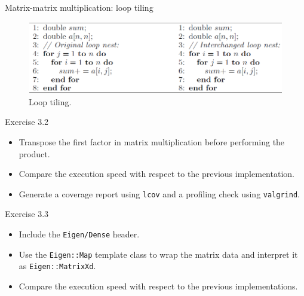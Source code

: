 \documentclass[10pt]{beamer}
\begin{document}
\begin{frame}{Matrix-matrix multiplication: loop tiling}
    \begin{figure}
        \centering
        \includegraphics[width=\textwidth]{images/loop_tiling.png}
        \caption{Loop tiling.}
    \end{figure}
\end{frame}

\begin{frame}{Exercise 3.2}
    \begin{itemize}
        \item Transpose the first factor in matrix multiplication before performing the product.
        \item Compare the execution speed with respect to the previous implementation.
        \item Generate a coverage report using \texttt{lcov} and a profiling check using \texttt{valgrind}.
    \end{itemize}
\end{frame}

\begin{frame}{Exercise 3.3}
    \begin{itemize}
        \item Include the \texttt{Eigen/Dense} header.
        \item Use the \texttt{Eigen::Map} template class to wrap the matrix data and interpret it as \texttt{Eigen::MatrixXd}.
        \item Compare the execution speed with respect to the previous implementations.
    \end{itemize}
\end{frame}
\end{document}
